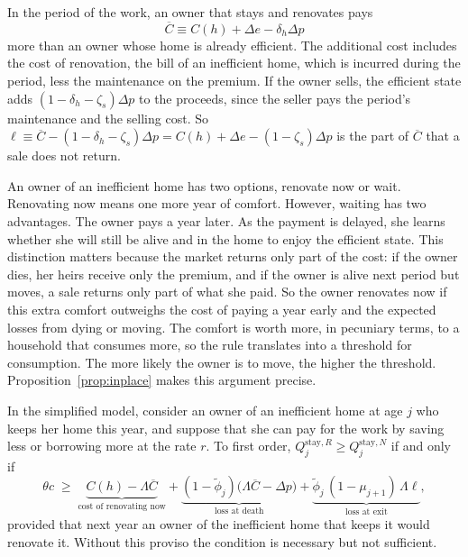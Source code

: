  In the period of the work, an owner that stays and renovates pays
\begin{equation*}
  \overline C\equiv C(h)+\Delta e-\delta_h\Delta p
\end{equation*}
more than an owner whose home is already efficient. The additional cost includes the cost of renovation, the
bill of an inefficient home, which is incurred during the period, less the maintenance on the premium. If the owner sells, the efficient state
adds $(1-\delta_h-\zeta_s)\Delta p$ to the proceeds, since the seller pays
the period's maintenance and the selling cost. So
$\ell\equiv\overline C-(1-\delta_h-\zeta_s)\Delta p
=C(h)+\Delta e-(1-\zeta_s)\Delta p$ is the part of $\overline C$ that a
sale does not return.


An owner of an inefficient home has two options, renovate now or wait. Renovating now means one more year of comfort. However, waiting has two advantages. The owner pays a year later. As the payment is delayed, she learns whether she will still be
alive and in the home to enjoy the efficient state. This distinction matters because
the market returns only part of the cost: if the owner dies, her heirs
receive only the premium, and if the owner is alive next period but moves, a sale returns only part of what she paid. So the owner renovates now if this extra  comfort outweighs the cost of paying a year early and the expected losses from dying or moving.
The comfort is worth more, in pecuniary terms, to a household that consumes more, so
the rule translates into a threshold for consumption. The more likely the owner is to
move, the higher the threshold. Proposition~\ref{prop:inplace} makes this argument
precise.

\begin{proposition}\label{prop:inplace}
In the simplified model, consider an owner of an inefficient home at age
$j$ who keeps her home this year, and suppose that she can pay for the
work by saving less or borrowing more at the rate $r$. To first order,
$Q_j^{\mathrm{stay},R}\ge Q_j^{\mathrm{stay},N}$ if and only if
\begin{equation}
  \theta c\;\ge\;
  \underbrace{C(h)-\Lambda\overline C}_{\text{cost of renovating now}}
  +\underbrace{(1-\tilde\phi_j)\bigl(\Lambda\overline C-\Delta p\bigr)}_{\text{loss at death}}
  +\underbrace{\tilde\phi_j\,(1-\mu_{j+1})\,\Lambda\ell}_{\text{loss at exit}},
  \label{eq:rule-inplace}
\end{equation}
provided that next year an owner of the inefficient home that keeps it
would renovate it. Without this proviso the condition is
necessary but not sufficient.
\end{proposition}




